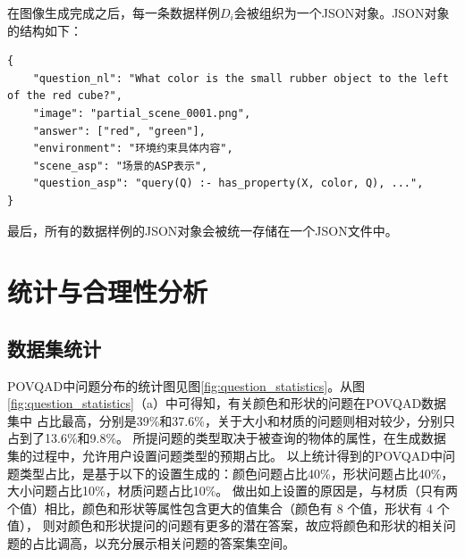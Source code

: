 在图像生成完成之后，每一条数据样例$D_i$会被组织为一个JSON对象。JSON对象的结构如下：
\begin{lstlisting}
{
    "question_nl": "What color is the small rubber object to the left of the red cube?",
    "image": "partial_scene_0001.png",
    "answer": ["red", "green"],
    "environment": "环境约束具体内容",
    "scene_asp": "场景的ASP表示",
    "question_asp": "query(Q) :- has_property(X, color, Q), ...",
}
\end{lstlisting}

最后，所有的数据样例的JSON对象会被统一存储在一个JSON文件中。
\section{统计与合理性分析}
\subsection{数据集统计}
POVQAD中问题分布的统计图见图\ref{fig:question_statistics}。从图\ref{fig:question_statistics}（a）中可得知，有关颜色和形状的问题在POVQAD数据集中
占比最高，分别是39\%和37.6\%，关于大小和材质的问题则相对较少，分别只占到了13.6\%和9.8\%。
所提问题的类型取决于被查询的物体的属性，在生成数据集的过程中，允许用户设置问题类型的预期占比。
以上统计得到的POVQAD中问题类型占比，是基于以下的设置生成的：颜色问题占比40\%，形状问题占比40\%，大小问题占比10\%，材质问题占比10\%。
做出如上设置的原因是，与材质（只有两个值）相比，颜色和形状等属性包含更大的值集合（颜色有 8 个值，形状有 4 个值），
则对颜色和形状提问的问题有更多的潜在答案，故应将颜色和形状的相关问题的占比调高，以充分展示相关问题的答案集空间。

